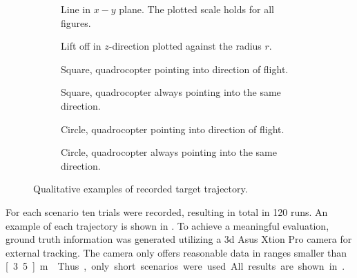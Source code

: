 \begin{figure}[]
  \centering
  
  \begin{subfigure}[]{0.475\textwidth}
    \centering
    
    \caption{Line in $x-y$ plane. The plotted scale holds for all figures.}
    \label{fig:robot_experiments_manual_line1}
  \end{subfigure}\hfill
  \begin{subfigure}[]{0.475\textwidth}
    \centering
    
    \caption{Lift off in $z$-direction plotted against the radius $r$.}
    \label{fig:robot_experiments_manual_line2}
  \end{subfigure}
  \begin{subfigure}[]{0.475\textwidth}
    \centering
    
    \caption{Square, quadrocopter pointing into direction of flight.}
    \label{fig:robot_experiments_manual_square1}
  \end{subfigure}\hfill
  \begin{subfigure}[]{0.475\textwidth}
    \centering
    
    \caption{Square, quadrocopter always pointing into the same direction.}
    \label{fig:robot_experiments_manual_square2}
  \end{subfigure}
  \begin{subfigure}[]{0.475\textwidth}
    \centering
    
    \caption{Circle, quadrocopter pointing into direction of flight.}
    \label{fig:robot_experiments_manual_circle1}
  \end{subfigure}\hfill
  \begin{subfigure}[]{0.475\textwidth}
    \centering
    
    \caption{Circle, quadrocopter always pointing into the same direction.}
    \label{fig:robot_experiments_manual_circle2}
  \end{subfigure}
  \caption{Qualitative examples of recorded target trajectory.}
  \label{fig:robot_experiments_manual}
\end{figure}

For each scenario ten trials were recorded, resulting in total in 120 runs.
An example of each trajectory is shown in .
To achieve a meaningful evaluation, ground truth information was generated utilizing a 3d Asus Xtion Pro camera for external tracking.
The camera only offers reasonable data in ranges smaller than \unit[3.5]{m}~\cite{haggag2013measuring}.
Thus, only short scenarios were used.
All results are shown in .

